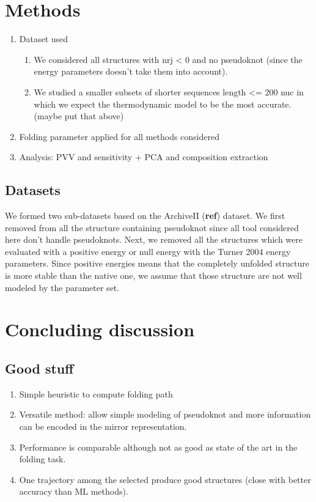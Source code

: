 \documentclass[a4paper,12pt]{article}
\begin{document}
{{\section{Methods}
\label{sec:org306b1fe}
\begin{enumerate}
\item Dataset used
\begin{enumerate}
\item We considered all structures with nrj < 0 and no pseudoknot (since the
energy parameters doesn't take them into account).
\item We studied a smaller subsets of shorter sequences length <= 200 nuc in
which we expect the thermodynamic model to be the most accurate. (maybe
put that above)
\end{enumerate}
\item Folding parameter applied for all methods considered
\item Analysis: PVV and sensitivity + PCA and composition extraction
\end{enumerate}
\subsection{Datasets}
\label{sec:org4ee8a03}
We formed two sub-datasets based on the ArchiveII (\textbf{ref}) dataset. We first
removed from all the structure containing pseudoknot since all tool considered
here don't handle pseudoknots. Next, we removed all the structures which were
evaluated with a positive energy or null energy with the Turner 2004 energy
parameters. Since positive energies means that the completely unfolded structure
is more stable than the native one, we assume that those structure are not well
modeled by the parameter set.

\clearpage
\section{Concluding discussion}
\label{sec:org861e6ca}
\subsection{Good stuff}
\label{sec:orge4ec0ab}
\begin{enumerate}
\item Simple heuristic to compute folding path
\item Versatile method: allow simple modeling of pseudoknot and more information
can be encoded in the mirror representation.
\item Performance is comparable although not as good as state of the art in the
folding task.
\item One trajectory among the selected produce good structures (close with better
accuracy than ML methods).
\end{enumerate}

}}
\end{document}
